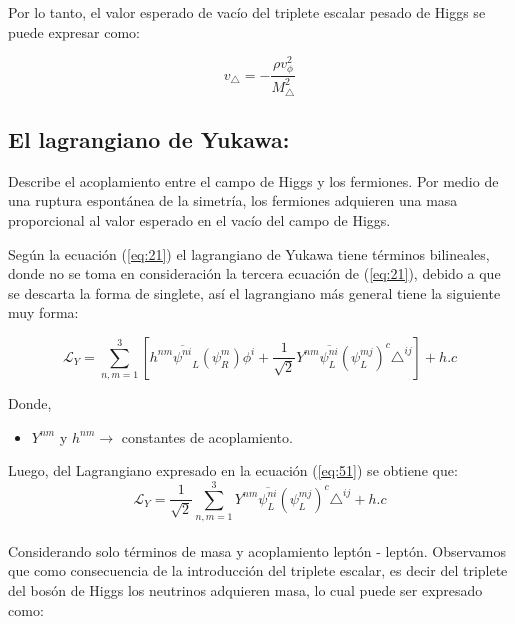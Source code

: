 \documentclass[12pt]{article}
\begin{document}
Por lo tanto, el valor esperado de vacío del triplete escalar pesado de Higgs se puede expresar como:

\begin{equation}
    \label{eq:valoresperadodevacío}
     v_\triangle = - \frac{\rho v^{2}_\phi}{M^{2}_\triangle}
\end{equation}


\subsection{El lagrangiano de Yukawa:} 

Describe el acoplamiento entre el campo de Higgs y los fermiones. Por medio de una ruptura espontánea de la simetría, los fermiones adquieren una masa proporcional al valor esperado en el vacío del campo de Higgs. 

Según la ecuación (\ref{eq:21}) el lagrangiano de Yukawa tiene términos bilineales, donde no se toma en consideración la tercera ecuación de (\ref{eq:21}), debido a que se descarta la forma de singlete, así el lagrangiano más general tiene la siguiente muy forma: 

\begin{equation}
    \label{eq:51}
    \mathcal{L}_Y=  \sum_{n,m=1}^3 [ h^{nm} \overline{\psi^{ni}}_L ({\psi_R^{m}})\phi^i + \frac{1}{\sqrt{2}} Y^{nm} \overline{\psi_L^{ni}} ({\psi_L^{mj}})^{c} \triangle^{ij}] + h.c
\end{equation}

Donde, 

\begin{itemize}
    \item $Y^{nm}$ y $h^{nm} \rightarrow $ constantes de acoplamiento. 
\end{itemize}

  

Luego, del Lagrangiano expresado en la ecuación (\ref{eq:51}) se obtiene que: \\

\begin{equation}
    \mathcal{L}_Y= \frac{1}{\sqrt{2}} \sum_{n,m=1}^3 Y^{nm} \overline{\psi_L^{ni}} ({\psi_L^{mj}})^{c} \triangle^{ij} + h.c 
    \label{eq:17}
\end{equation}  \\

Considerando solo términos de masa y acoplamiento leptón - leptón.
Observamos que como consecuencia de la introducción del triplete escalar, es decir del triplete del bosón de Higgs los neutrinos adquieren masa, lo cual puede ser expresado como:\\
\end{document}

